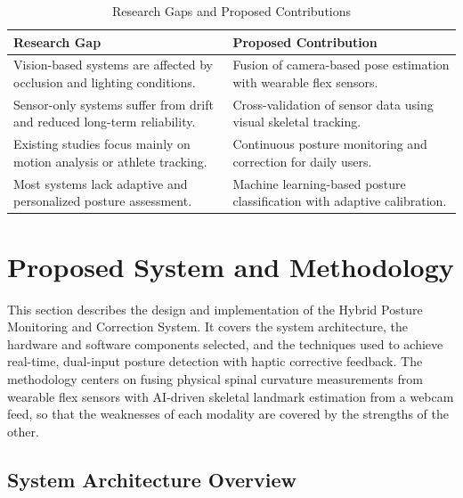 \documentclass[conference]{IEEEtran}
\begin{document}
\begin{table}[ht]
\centering
\caption{Research Gaps and Proposed Contributions}
\label{tab:gap}
\renewcommand{\arraystretch}{1.15}

\begin{tabular}{|p{3cm}|p{3.8cm}|}
\hline
\textbf{Research Gap} & \textbf{Proposed Contribution} \\
\hline

Vision-based systems are affected by occlusion and lighting conditions. &
Fusion of camera-based pose estimation with wearable flex sensors. \\
\hline

Sensor-only systems suffer from drift and reduced long-term reliability. &
Cross-validation of sensor data using visual skeletal tracking. \\
\hline

Existing studies focus mainly on motion analysis or athlete tracking. &
Continuous posture monitoring and correction for daily users. \\
\hline

Most systems lack adaptive and personalized posture assessment. &
Machine learning-based posture classification with adaptive calibration. \\
\hline

\end{tabular}
\end{table}


\section{Proposed System and Methodology}

This section describes the design and implementation of the 
Hybrid Posture Monitoring and Correction System. It covers 
the system architecture, the hardware and software components 
selected, and the techniques used to achieve real-time, 
dual-input posture detection with haptic corrective feedback. 
The methodology centers on fusing physical spinal curvature 
measurements from wearable flex sensors with AI-driven 
skeletal landmark estimation from a webcam feed, so that 
the weaknesses of each modality are covered by the strengths 
of the other.

\subsection{System Architecture Overview}
\end{document}
